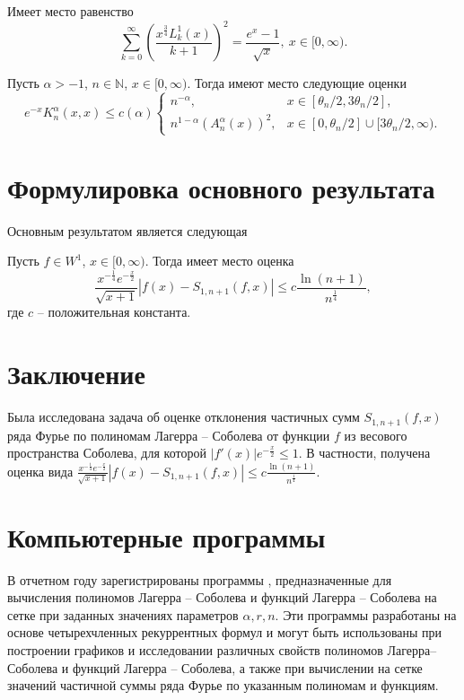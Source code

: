 \begin{lemma}
Имеет место равенство
\begin{equation*}
\sum_{k=0}^{\infty}\left(\frac{x^{\frac34}L_k^1(x)}{k+1}\right)^2 = \frac{e^{x}-1}{\sqrt{x}}, \ x\in[0,\infty).
\end{equation*}
\end{lemma}

\begin{lemma}
\cite{Gadzhimirzaev:mathnot2021}	
Пусть $\alpha>-1$, $n\in\mathbb{N}$, $x\in[0,\infty)$. Тогда имеют место следующие оценки
\begin{equation*}
e^{-x}K_{n}^\alpha(x,x)\le c(\alpha)
\begin{cases}
n^{-\alpha}, & x\in[\theta_n/2, 3\theta_n/2], \\
n^{1-\alpha}(A_n^\alpha(x))^2, & x\in[0,\theta_n/2]\cup[3\theta_n/2,\infty).
\end{cases}
\end{equation*}
\end{lemma}

\section{Формулировка основного результата}
Основным результатом является следующая
\begin{theorem}\label{Gadzhimirzaev:theorem1}
Пусть $f\in W^1$, $x\in[0,\infty)$. Тогда имеет место оценка
$$
\frac{x^{-\frac14}e^{-\frac x2}}{\sqrt{x+1}}|f(x)-S_{1,n+1}(f,x)|\le c
\frac{\ln(n+1)}{n^{\frac14}},
$$
где $c$ -- положительная константа.
\end{theorem}

\section{Заключение}

Была исследована задача об оценке отклонения частичных сумм $S_{1,n+1}(f,x)$ ряда Фурье по полиномам Лагерра -- Соболева от функции $f$ из весового пространства Соболева, для которой $|f'(x)|e^{-\frac x2}\le 1$.
В частности, получена оценка вида $\frac{x^{-\frac14}e^{-\frac x2}}{\sqrt{x+1}}|f(x)-S_{1,n+1}(f,x)|\le c
\frac{\ln(n+1)}{n^{\frac14}}.$

\section{Компьютерные программы} 
В отчетном году зарегистрированы программы \cite{Sal-Ram1,Sal-Ram2}, предназначенные для вычисления полиномов Лагерра -- Соболева и функций Лагерра -- Соболева на сетке при заданных значениях параметров $\alpha, r, n$. Эти программы разработаны на основе четырехчленных рекуррентных формул и могут быть использованы при построении графиков и исследовании различных свойств полиномов Лагерра–Соболева и функций Лагерра -- Соболева, а также при вычислении на сетке значений частичной суммы ряда Фурье по указанным полиномам и функциям.

% 
